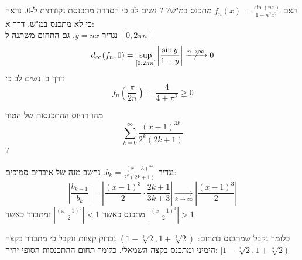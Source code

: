 \documentclass{tstextbook}
\begin{document}
האם \(f_n(x)=\frac{\sin(nx)}{1+n^2 x^2}\) מתכנס במ"ש?
?
נשים לב כי הסדרה מתכנסת נקודתית ל-0. נראה כי לא מתכנס במ"ש. 
דרך א:\\

נגדיר \(y=nx\). גם התחום משתנה ל-\([0,2\pi n]\)$$d_\infty(f_n,0)=\sup_{[0,2\pi n]} \left|\frac{\sin y}{1+y}\right|\centernot{\xrightarrow{n\rightarrow\infty}}  0$$
דרך ב:
נשים לב כי
$$f_n\left(\frac{\pi}{2n}\right) = \frac{4}{4+\pi^2}\geq 0$$

מהו רדיוס ההתכנסות של הטור
$$\sum_{k=0}^\infty \frac{(x-1)^{3k}}{2^k(2k+1)}$$
?

נגדיר \(b_k = \frac{(x-3)^{3k}}{2^k (2k+1)}\). נחשב מנה של איברים סמוכים:
$$\left|\frac{b_{k+1}}{b_k}\right|=\left|\frac{(x-1)^3}{2}\cdot \frac{2k+1}{3k+3}\right|\xrightarrow[k\rightarrow\infty]{}\left|\frac{(x-1)^3}{2}\right|$$
מתכנס כאשר \(\left|\frac{(x-1)^3}{2}\right|<1\) ומתבדר כאשר \(\left|\frac{(x-1)^3}{2}\right|>1\)

כלומר נקבל שמתכנס בתחום:
\((1-\sqrt[3]2,1+\sqrt[3]2)\)
נבדוק קצוות ונקבל כי מתבדר בקצה הימיני ומתכנס בקצה השמאלי. כלומר תחום ההתכנסות הסופי יהיה:
\([1-\sqrt[3]{2},1+\sqrt[3]{2})\)
\end{document}

